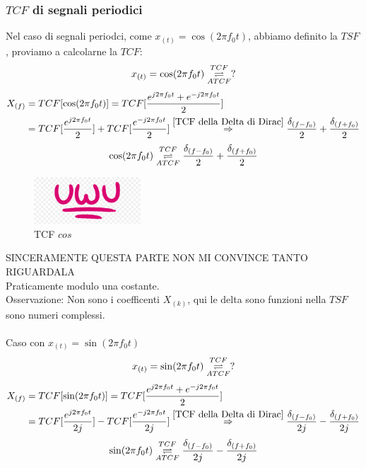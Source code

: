         \subsubsection{$TCF$ di segnali periodici}\label{TCF di segnali periodici}
                Nel caso di segnali periodci, come $x_{(t)} = \cos(2\pi f_0t)$, abbiamo definito la $TSF$, proviamo a calcolarne la $TCF$:
                \[
                    x_{(t)} = \cos(2\pi f_0t) \overunderset{TCF}{ATCF}{\rightleftharpoons} ?
                \] 
                \begin{align}
                    X_{(f)} &= TCF[\cos(2\pi f_0t)] = TCF[\frac{e^{j2\pi f_0t}+ e^{-j2\pi f_0t}}{2}] \nonumber \\
                            &= TCF[\frac{e^{j2\pi f_0t}}{2}] + TCF[\frac{e^{-j2\pi f_0t}}{2}] \overset{\ref{TCF della Delta di Dirac}}{\Rightarrow}  \frac{\delta_{(f-f_0)}}{2} +\frac{\delta_{(f+f_0)}}{2} \nonumber
                \end{align}
                \[
                    \cos(2\pi f_0t) \overunderset{TCF}{ATCF}{\rightleftharpoons} \frac{\delta_{(f-f_0)}}{2} +\frac{\delta_{(f+f_0)}}{2}
                \]\label{TCF di un coseno}

                \begin{figure}[H]
                    \centering
                    \includegraphics[width=4cm]{media/uwu.png}
                    \caption{TCF $cos$}
                    \label{fig:TCF cos}
                \end{figure}
                SINCERAMENTE QUESTA PARTE NON MI CONVINCE TANTO RIGUARDALA\\
                Praticamente modulo una costante.\\
                Osservazione: Non sono i coefficenti $X_{(k)}$, qui le delta sono funzioni nella $TSF$ sono numeri complessi.\\
                \\
                Caso con $x_{(t)} = \sin(2\pi f_0t)$
                \[
                    x_{(t)} = \sin(2\pi f_0t) \overunderset{TCF}{ATCF}{\rightleftharpoons} ?
                \] 
                \begin{align}
                    X_{(f)} &= TCF[\sin(2\pi f_0t)] = TCF[\frac{e^{j2\pi f_0t}+ e^{-j2\pi f_0t}}{2}] \nonumber \\
                            &= TCF[\frac{e^{j2\pi f_0t}}{2j}] - TCF[\frac{e^{-j2\pi f_0t}}{2j}] \overset{\ref{TCF della Delta di Dirac}}{\Rightarrow}  \frac{\delta_{(f-f_0)}}{2j} -\frac{\delta_{(f+f_0)}}{2j} \nonumber
                \end{align}
                \[
                    \sin(2\pi f_0t) \overunderset{TCF}{ATCF}{\rightleftharpoons} \frac{\delta_{(f-f_0)}}{2j} -\frac{\delta_{(f+f_0)}}{2j}
                \]\label{TCF di un sin}


